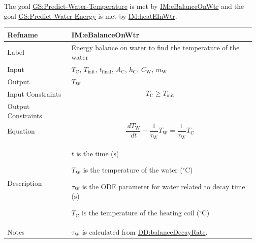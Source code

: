 \documentclass[12pt]{article}
\begin{document}
The goal \hyperref[waterTempGS]{GS:Predict-Water-Temperature} is met by \hyperref[IM:eBalanceOnWtr]{IM:eBalanceOnWtr} and the goal \hyperref[waterEnergyGS]{GS:Predict-Water-Energy} is met by \hyperref[IM:heatEInWtr]{IM:heatEInWtr}.

\vspace{\baselineskip}
\noindent
\begin{minipage}{\textwidth}
\begin{tabular}{>{\raggedright}p{}>{\raggedright\arraybackslash}p{}}
\toprule \textbf{Refname} & \textbf{IM:eBalanceOnWtr}
\label{IM:eBalanceOnWtr}
\\ \midrule
Label & Energy balance on water to find the temperature of the water
        
\\ \midrule
Input & ${T_{\text{C}}}$, ${T_{\text{init}}}$, ${t_{\text{final}}}$, ${A_{\text{C}}}$, ${h_{\text{C}}}$, ${C_{\text{W}}}$, ${m_{\text{W}}}$
        
\\ \midrule
Output & ${T_{\text{W}}}$
         
\\ \midrule
Input Constraints & \begin{displaymath}
                    {T_{\text{C}}}\geq{}{T_{\text{init}}}
                    \end{displaymath}
\\ \midrule
Output Constraints & 
\\ \midrule
Equation & \begin{displaymath}
           \frac{\,d{T_{\text{W}}}}{\,dt}+\frac{1}{{τ_{\text{W}}}} {{T_{\text{W}}}}=\frac{1}{{τ_{\text{W}}}} {T_{\text{C}}}
           \end{displaymath}
\\ \midrule
Description & \begin{symbDescription}
              \item{$t$ is the time (${\text{s}}$)}
              \item{${T_{\text{W}}}$ is the temperature of the water (${{}^{\circ}\text{C}}$)}
              \item{${τ_{\text{W}}}$ is the ODE parameter for water related to decay time (${\text{s}}$)}
              \item{${T_{\text{C}}}$ is the temperature of the heating coil (${{}^{\circ}\text{C}}$)}
              \end{symbDescription}
\\ \midrule
Notes & ${τ_{\text{W}}}$ is calculated from \hyperref[DD:balanceDecayRate]{DD:balanceDecayRate}.
        

\end{tabular}
\end{minipage}
\end{document}
